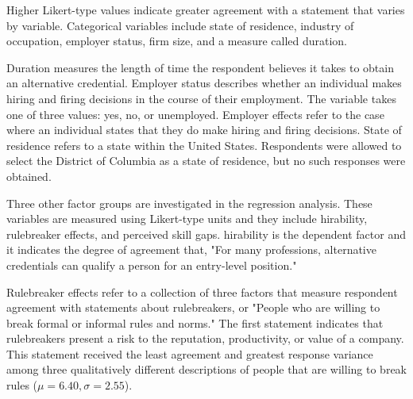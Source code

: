 \documentclass[review]{elsarticle}
\begin{document}
Higher Likert-type values indicate greater agreement with a statement that varies by variable.
Categorical variables include state of residence,
industry of occupation,
employer status,
firm size,
and a measure called duration.

Duration measures the length of time the respondent believes it takes to obtain an alternative credential.
Employer status describes whether an individual makes hiring and firing decisions in the course of their employment.
The variable takes one of three values: yes, no, or unemployed.
Employer effects refer to the case where an individual states that they do make hiring and firing decisions.
State of residence refers to a state within the United States.
Respondents were allowed to select the District of Columbia as a state of residence,
but no such responses were obtained.

Three other factor groups are investigated in the regression analysis.
These variables are measured using Likert-type units and they include hirability,
rulebreaker effects,
and perceived skill gaps.
hirability is the dependent factor and it indicates the degree of agreement that, "For many professions, alternative credentials can qualify a person for an entry-level position."

Rulebreaker effects refer to a collection of three factors that measure respondent agreement with statements about rulebreakers, or "People who are willing to break formal or informal rules and norms."
The first statement indicates that rulebreakers present a risk to the reputation, productivity, or value of a company.
This statement received the least agreement and greatest response variance among three qualitatively different descriptions of people that are willing to break rules ($\mu = 6.40, \sigma = 2.55$).
\end{document}
